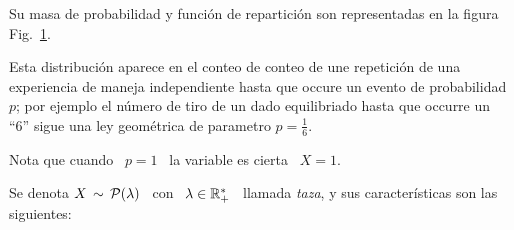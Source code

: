 Su masa  de probabilidad  y funci\'on de  repartici\'on son representadas  en la
figura Fig.~\ref{Fig:MP:Geometrica}.
%
\begin{figure}[h!]
\begin{center}  \end{center}
%
\label{Fig:MP:Geometrica}
\end{figure}

Esta distribuci\'on  aparece en el conteo  de conteo de une  repetici\'on de una
experiencia de maneja  independiente hasta que occure un  evento de probabilidad
$p$; por ejemplo  el n\'umero de tiro de un dado  equilibriado hasta que occurre
un ``6'' sigue una ley geom\'etrica de parametro $p = \frac16$.

Nota que cuando \  $p =  1$ \ la variable es cierta \  $X = 1$.   




\label{Sssec:MP:Poisson}

Se denota $X \,  \sim \, \P(\lambda)$ \ con \ $\lambda  \in \Rset_+^*$ \ llamada
{\em taza}, y sus caracter\'isticas son las siguientes:

